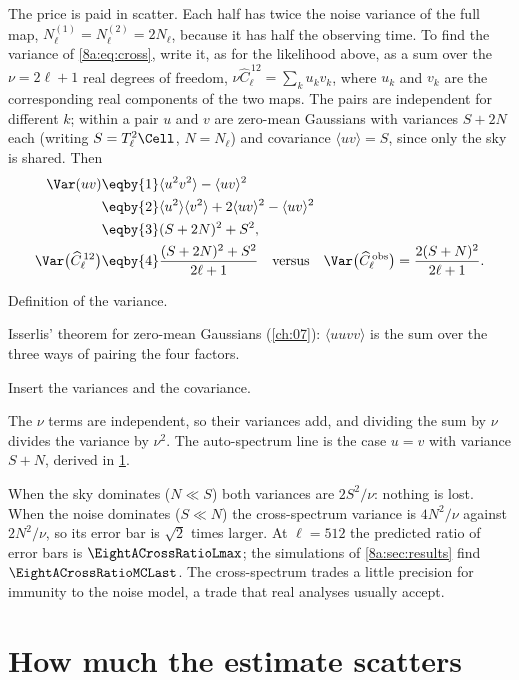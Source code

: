 The price is paid in scatter. Each half has twice the noise variance of the full map,
$N^{(1)}_\ell=N^{(2)}_\ell=2N_\ell$, because it has half the observing time. To find the variance
of \eqref{8a:eq:cross}, write it, as for the likelihood above, as a sum over the $\nu=2\ell+1$
real degrees of freedom, $\nu\widehat C^{\,12}_\ell=\sum_k u_kv_k$, where $u_k$ and $v_k$ are the
corresponding real components of the two maps. The pairs are independent for different $k$;
within a pair $u$ and $v$ are zero-mean Gaussians with variances $S+2N$ each (writing $S=T_\ell^2\Cell$,
$N=N_\ell$) and covariance $\langle uv\rangle=S$, since only the sky is shared. Then
\begin{align}
  \Var(uv)
  &\eqby{1}\langle u^2v^2\rangle-\langle uv\rangle^2 \nonumber\\
  &\eqby{2}\langle u^2\rangle\langle v^2\rangle+2\langle uv\rangle^2-\langle uv\rangle^2 \nonumber\\
  &\eqby{3}(S+2N)^2+S^2 ,
  \label{8a:eq:var-uv}\\
  \Var\bigl(\widehat C^{\,12}_\ell\bigr)
  &\eqby{4}\frac{(S+2N)^2+S^2}{2\ell+1}
  \quad\text{versus}\quad
  \Var\bigl(\widehat C^{\,\rm obs}_\ell\bigr)=\frac{2(S+N)^2}{2\ell+1}.
  \label{8a:eq:var-cross}
\end{align}
\begin{explain}
  \item Definition of the variance.
  \item Isserlis' theorem for zero-mean Gaussians (\cref{ch:07}): $\langle uuvv\rangle$ is the sum
        over the three ways of pairing the four factors.
  \item Insert the variances and the covariance.
  \item The $\nu$ terms are independent, so their variances add, and dividing the sum by $\nu$
        divides the variance by $\nu^2$. The auto-spectrum line is the case $u=v$ with variance
        $S+N$, derived in \cref{8a:sec:variance}.
\end{explain}
When the sky dominates ($N\ll S$) both variances are $2S^2/\nu$: nothing is lost. When the
noise dominates ($S\ll N$) the cross-spectrum variance is $4N^2/\nu$ against $2N^2/\nu$, so its
error bar is $\sqrt2$ times larger. At $\ell=512$ the predicted ratio of error bars is
$\EightACrossRatioLmax$; the simulations of \cref{8a:sec:results} find $\EightACrossRatioMCLast$.
The cross-spectrum trades a little precision for immunity to the noise model, a trade that
real analyses usually accept.
\section{How much the estimate scatters}
\label{8a:sec:variance}

